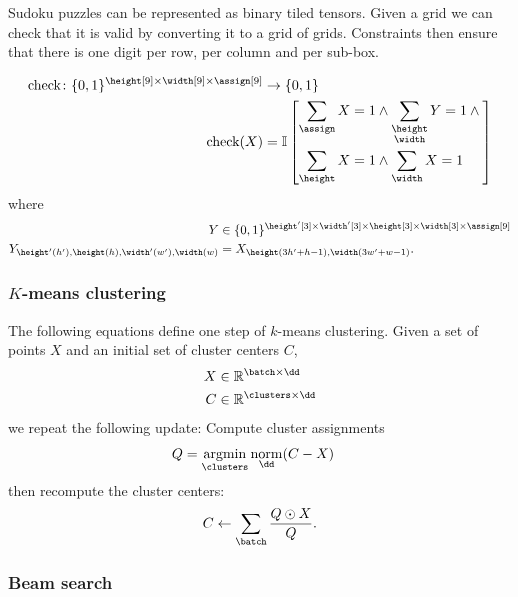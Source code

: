 \documentclass{article}
\newcommand{\reals}{\mathbb{R}}
\begin{document}

Sudoku puzzles can be represented as  binary tiled tensors.
Given a grid we can check that it is valid by converting it to a grid of grids. 
Constraints then ensure that there is one digit per row, per column and per sub-box.

\begin{align*}
\text{check} \colon \{0, 1\}^{\height[9] \times \width[9] \times \assign[9]} &\rightarrow \{0, 1\} \\
\text{check}(X) &=
\mathbb{I}\left[\begin{aligned}
\nsum{\assign} X = 1 &\land \nsum{\height \\ \width} Y = 1 \land {} \\
\nsum{\height} X = 1 &\land \nsum{\width} X = 1
\end{aligned}\right]
\end{align*}
where
\begin{align*}
Y &\in \{0, 1\}^{\height'[3] \times \width'[3] \times \height[3] \times \width[3] \times \assign[9]}  \\
Y_{\height'(h'), \height(h), \width'(w'), \width(w)} &= X_{\height(3h' + h-1), \width(3 w' + w-1)}.
\end{align*} 

\subsubsection{$K$-means clustering}


The following equations define one step of $k$-means clustering. Given a set of points $X$ and an initial set of cluster centers $C$,
\begin{align*}
  X &\in \reals^{\batch \times \dd} \\
C &\in \reals^{\clusters \times \dd}
\end{align*}
we repeat the following update: Compute cluster assignments
\begin{align*}
Q &= \nfun{\clusters}{argmin} \nfun{\dd}{norm}(C-X)
\end{align*}
then recompute the cluster centers:
\begin{equation*}
C \leftarrow \nsum{\batch} \frac{Q \odot X}{Q}.
\end{equation*}

\subsubsection{Beam search}
\end{document}
